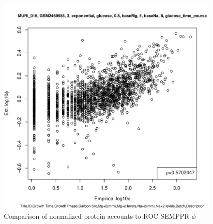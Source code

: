 \documentclass[11pt]{labbook}
\begin{document}
\begin{figure}[H]
\centering
\includegraphics[page=1,scale=0.6]{Ecoli_REL606/GSE94117_norm_sf_protein.pdf}
\caption{Comparison of normalized protein accounts to ROC-SEMPPR $\phi$}
\end{figure}
\end{document}
